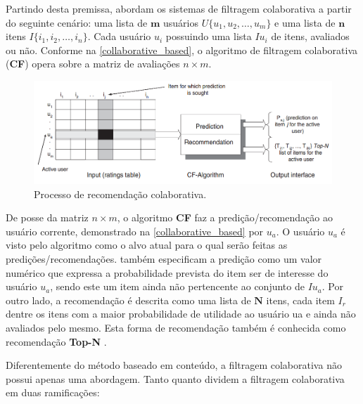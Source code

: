 \documentclass[12pt, openright, oneside, a4paper, brazil]{abntex2}
\begin{document}
Partindo desta premissa,  abordam os sistemas de filtragem colaborativa a partir do seguinte cenário: uma lista de $\textbf{m}$ usuários $U \lbrace u_{1}, u_{2}, …, u_{m} \rbrace$ e uma lista de $\textbf{n}$ itens $I \lbrace i_{1}, i_{2}, …, i_{n} \rbrace$. Cada usuário $u_{i}$ possuindo uma lista $Iu_{i}$ de itens, avaliados ou não. Conforme na \autoref{collaborative_based}, o algoritmo de filtragem colaborativa (\textbf{CF}) opera sobre a matriz de avaliações $n \times m$.

\begin{figure}[htb]
	\caption{\label{collaborative_based}Processo de recomendação colaborativa.}
	\begin{center}
		\includegraphics[scale=0.6]{images/collaborative_based.png}
	\end{center}
\end{figure}

De posse da matriz $n \times m$, o algoritmo \textbf{CF} faz a predição/recomendação ao usuário corrente, demonstrado na \autoref{collaborative_based} por $u_{a}$. O usuário $u_{a}$ é visto pelo algoritmo como o alvo atual para o qual serão feitas as predições/recomendações.  também especificam a predição como um valor numérico que expressa a probabilidade prevista do item ser de interesse do usuário $u_{a}$, sendo este um item ainda não pertencente ao conjunto de $Iu_{a}$. Por outro lado, a recomendação é descrita como uma lista de $\textbf{N}$ itens, cada item $I_{r}$ dentre os itens com a maior probabilidade de utilidade ao usuário ua e ainda não avaliados pelo mesmo. Esta forma de recomendação também é conhecida como recomendação \textbf{Top-N} \cite{adomavicius2005toward}.

Diferentemente do método baseado em conteúdo, a filtragem colaborativa não possui apenas uma abordagem. Tanto  quanto  dividem a filtragem colaborativa em duas ramificações:
\end{document}
